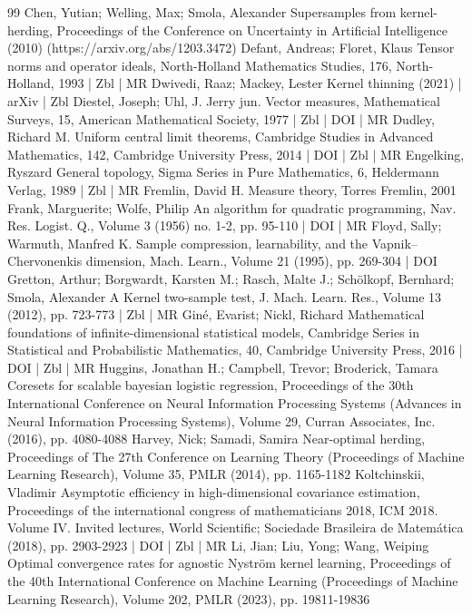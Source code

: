 \documentclass[10pt]{amsart}
\theoremstyle{definition}\newtheorem{defi}[theo]{Definition}\newtheorem{rema}[theo]{Remark}\newtheorem{exam}[theo]{Example}\newtheorem{exem}[theo]{Example}\newtheorem{nota}[theo]{Notation}
\theoremstyle{remark}
\begin{document}
\begin{thebibliography}{99}
Chen, Yutian; Welling, Max; Smola, Alexander Supersamples from kernel-herding, Proceedings of the Conference on Uncertainty in Artificial Intelligence (2010) (https://arxiv.org/abs/1203.3472)
Defant, Andreas; Floret, Klaus Tensor norms and operator ideals, North-Holland Mathematics Studies, 176, North-Holland, 1993 | Zbl | MR
Dwivedi, Raaz; Mackey, Lester Kernel thinning (2021) | arXiv | Zbl
Diestel, Joseph; Uhl, J. Jerry jun. Vector measures, Mathematical Surveys, 15, American Mathematical Society, 1977 | Zbl | DOI | MR
Dudley, Richard M. Uniform central limit theorems, Cambridge Studies in Advanced Mathematics, 142, Cambridge University Press, 2014 | DOI | Zbl | MR
Engelking, Ryszard General topology, Sigma Series in Pure Mathematics, 6, Heldermann Verlag, 1989 | Zbl | MR
Fremlin, David H. Measure theory, Torres Fremlin, 2001
Frank, Marguerite; Wolfe, Philip An algorithm for quadratic programming, Nav. Res. Logist. Q., Volume 3 (1956) no. 1-2, pp. 95-110 | DOI | MR
Floyd, Sally; Warmuth, Manfred K. Sample compression, learnability, and the Vapnik–Chervonenkis dimension, Mach. Learn., Volume 21 (1995), pp. 269-304 | DOI
Gretton, Arthur; Borgwardt, Karsten M.; Rasch, Malte J.; Schölkopf, Bernhard; Smola, Alexander A Kernel two-sample test, J. Mach. Learn. Res., Volume 13 (2012), pp. 723-773 | Zbl | MR
Giné, Evarist; Nickl, Richard Mathematical foundations of infinite-dimensional statistical models, Cambridge Series in Statistical and Probabilistic Mathematics, 40, Cambridge University Press, 2016 | DOI | Zbl | MR
Huggins, Jonathan H.; Campbell, Trevor; Broderick, Tamara Coresets for scalable bayesian logistic regression, Proceedings of the 30th International Conference on Neural Information Processing Systems (Advances in Neural Information Processing Systems), Volume 29, Curran Associates, Inc. (2016), pp. 4080-4088
Harvey, Nick; Samadi, Samira Near-optimal herding, Proceedings of The 27th Conference on Learning Theory (Proceedings of Machine Learning Research), Volume 35, PMLR (2014), pp. 1165-1182
Koltchinskii, Vladimir Asymptotic efficiency in high-dimensional covariance estimation, Proceedings of the international congress of mathematicians 2018, ICM 2018. Volume IV. Invited lectures, World Scientific; Sociedade Brasileira de Matemática (2018), pp. 2903-2923 | DOI | Zbl | MR
Li, Jian; Liu, Yong; Wang, Weiping Optimal convergence rates for agnostic Nyström kernel learning, Proceedings of the 40th International Conference on Machine Learning (Proceedings of Machine Learning Research), Volume 202, PMLR (2023), pp. 19811-19836

\end{thebibliography}
\end{document}
